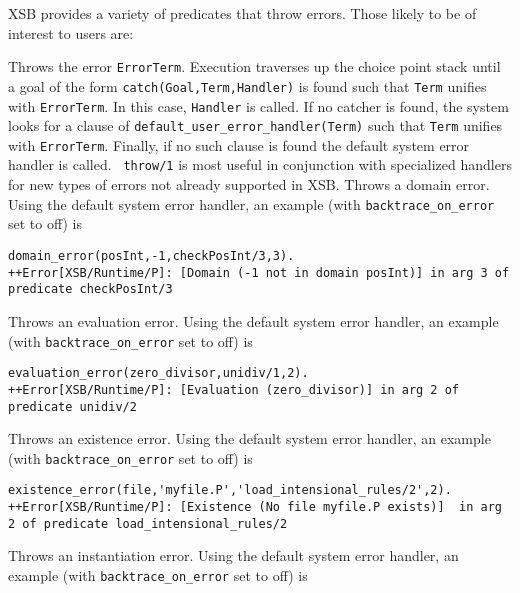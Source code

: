 XSB provides a variety of predicates that throw errors.  Those likely
to be of interest to users are:
\begin{description}
%
Throws the error {\tt ErrorTerm}.  Execution traverses up the choice
point stack until a goal of the form {\tt catch(Goal,Term,Handler)} is
found such that {\tt Term} unifies with {\tt ErrorTerm}.  In this
case, {\tt Handler} is called.  If no catcher is found, the system
looks for a clause of {\tt default\_user\_error\_handler(Term)} such
that {\tt Term} unifies with {\tt ErrorTerm}.  Finally, if no such
clause is found the default system error handler is called.  {\tt
  throw/1} is most useful in conjunction with specialized handlers for
new types of errors not already supported in XSB.
%
Throws a domain error.  Using the default system error handler, an
example (with {\tt backtrace\_on\_error} set to off) is {\small
\begin{verbatim}
domain_error(posInt,-1,checkPosInt/3,3).
++Error[XSB/Runtime/P]: [Domain (-1 not in domain posInt)] in arg 3 of predicate checkPosInt/3
\end{verbatim} }
%
Throws an evaluation error.  Using the default system error handler, an
example (with {\tt backtrace\_on\_error} set to off) is {\small
\begin{verbatim}
evaluation_error(zero_divisor,unidiv/1,2).
++Error[XSB/Runtime/P]: [Evaluation (zero_divisor)] in arg 2 of predicate unidiv/2
\end{verbatim} }
%
Throws an existence error.  Using the default system error
handler, an example (with {\tt backtrace\_on\_error} set to off) is 
{\small 
\begin{verbatim}
existence_error(file,'myfile.P','load_intensional_rules/2',2).
++Error[XSB/Runtime/P]: [Existence (No file myfile.P exists)]  in arg 2 of predicate load_intensional_rules/2
\end{verbatim}
}
%
Throws an instantiation error.  Using the default system error
handler, an example (with {\tt backtrace\_on\_error} set to off) is 
{\small 
}
\end{description}
